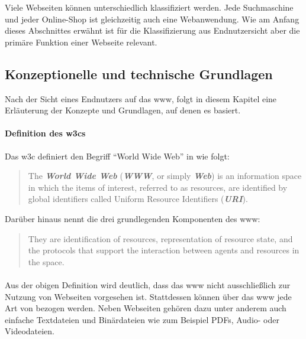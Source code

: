             Viele Webseiten können unterschiedlich klassifiziert werden.
            Jede Suchmaschine und jeder Online-Shop ist gleichzeitig auch eine
            Webanwendung. Wie am Anfang dieses Abschnittes erwähnt ist für die
            Klassifizierung aus Endnutzersicht aber die primäre Funktion einer Webseite
            relevant.

        \subsection{Konzeptionelle und technische Grundlagen}
            Nach der Sicht eines Endnutzers auf das \gls{www},
            folgt in diesem Kapitel eine Erläuterung der Konzepte und Grundlagen,
            auf denen es basiert.

            \paragraph*{Definition des \glspl{w3c}}
            Das \gls{w3c} definiert den Begriff "`World Wide Web"' in \cite{w3c:wwwArch} wie folgt:
    
            \begin{quote}
                The \textit{\textbf{World Wide Web}} (\textit{\textbf{WWW}}, or simply \textit{\textbf{Web}})
                is an information space in which the items of interest, referred to as resources,
                are identified by global identifiers called Uniform Resource Identifiers (\textit{\textbf{URI}}).
            \end{quote}

            Darüber hinaus nennt \cite{w3c:wwwArch} die drei grundlegenden Komponenten des \gls{www}:

            \begin{quote}
                They are identification of resources,
                representation of resource state, and the protocols
                that support the interaction between agents and resources in the space.
            \end{quote}

            \paragraph*{\resources}
            Aus der obigen Definition wird deutlich,
            dass das \gls{www} nicht ausschließlich zur Nutzung von Webseiten
            vorgesehen ist.
            Stattdessen können über das \gls{www} jede Art von {\resources} bezogen werden.
            Neben Webseiten gehören dazu unter anderem auch einfache Textdateien
            und Binärdateien wie zum Beispiel PDFs, Audio- oder Videodateien.

